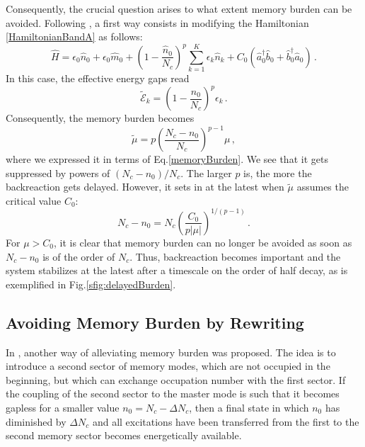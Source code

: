 \documentclass[aps,prd,reprint,superscriptaddress,nofootinbib]{revtex4-2}
\makeatletter
\newcommand*{\fig}{Fig.\@\xspace}
\newcommand*{\Eq}{Eq.\@\xspace}
\makeatother
\begin{document}
Consequently, the crucial question arises to what extent memory burden can be avoided. Following \cite{1812.08749}, a first way consists in modifying the Hamiltonian \eqref{HamiltonianBandA} as follows:
\begin{equation} \label{HamiltonianHigherOrder}
\hat{H} = \epsilon_0 \hat{n}_0 + \epsilon_0 \hat{m}_0 +  \left(1-\frac{\hat{n}_0}{N_c}\right)^p \sum_{k =1}^K \epsilon_k \hat{n}_k +  C_0\left( \hat{a}_0^\dagger \hat{b}_0 + \hat{b}_0^\dagger \hat{a}_0\right)   \,.
\end{equation}
 In this case, the effective energy gaps read
\begin{equation} \label{effectiveGapHigherOrder}
\tilde{\mathcal{E}}_k = \left(1-\frac{n_0}{N_c} \right)^p\epsilon_k \,.
\end{equation}
Consequently, the memory burden becomes
\begin{equation} \label{smallerBurden}
\tilde{\mu} =p \left(\frac{N_c-n_0}{N_c}\right)^{p-1}\mu \,,
\end{equation}
where we expressed it in terms of \Eq \eqref{memoryBurden}. We see that it gets suppressed by powers of $(N_c-n_0)/N_c$. The larger $p$ is, the more the backreaction gets delayed. However, it sets in at the latest when $\tilde{\mu}$ assumes the critical value $C_0$:
\begin{equation}
N_c-n_0 = N_c \left(\frac{C_0}{p |\mu|}\right)^{1/(p-1)}\,.
\end{equation}
For $\mu > C_0$, it is clear that memory burden can no longer be avoided as soon as $N_c-n_0 $ is of the order of $N_c$. Thus, backreaction becomes important and the system stabilizes at the latest after a timescale on the order of half decay, as is exemplified in \fig \ref{sfig:delayedBurden}.





\subsection{Avoiding Memory Burden by Rewriting}\label{ssec:avoidingMemoryBurden}
In \cite{1810.02336}, another way of alleviating memory burden was proposed. The idea is to introduce a second sector of memory modes, which are not occupied in the beginning, but which can exchange occupation number with the first sector. If the coupling of the second sector to the master mode is such that it becomes gapless for a smaller value $n_0 = N_c-\Delta N_c$, then a final state in which $n_0$ has diminished by $\Delta N_c$ 
and all excitations have been transferred from the first to the second memory sector becomes energetically available.
\end{document}
